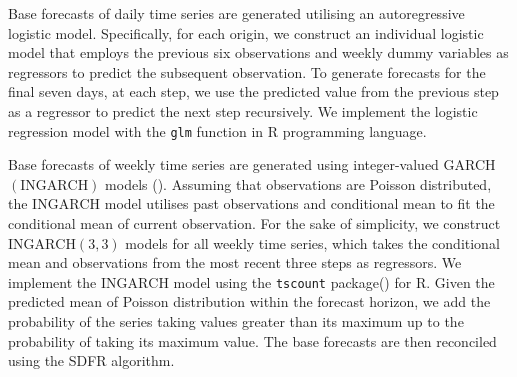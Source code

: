 \documentclass[a4paper,review,12pt,authoryear]{elsarticle}
\let\code=\texttt
\let\proglang=\textsf
\begin{document}
     Base forecasts of daily time series are generated utilising an autoregressive logistic model. 
     Specifically, for each origin, we construct an individual logistic model that employs the previous six observations and weekly dummy variables as regressors to predict the subsequent observation. 
     To generate forecasts for the final seven days, at each step, we use the predicted value from the previous step as a regressor to predict the next step recursively. 
     We implement the logistic regression model with the \code{glm} function in \proglang{R} programming language.
     
     Base forecasts of weekly time series are generated using integer-valued GARCH $(\textrm{INGARCH})$ models (). 
     Assuming that observations are Poisson distributed, the $\textrm{INGARCH}$ model utilises past observations and conditional mean to fit the conditional mean of current observation.
     For the sake of simplicity, we construct $\textrm{INGARCH}(3, 3)$ models for all weekly time series, which takes the conditional mean and observations from the most recent three steps as regressors. 
     We implement the $\textrm{INGARCH}$ model using the \code{tscount} package() for \proglang{R}.
     Given the predicted mean of Poisson distribution within the forecast horizon, we add the probability of the series taking values greater than its maximum up to the probability of taking its maximum value.
     The base forecasts are then reconciled using the \textrm{SDFR} algorithm.

     
\end{document}
